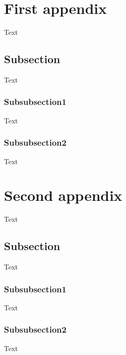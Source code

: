 \section{First appendix}\label{sec:first_appendix}
Text
\subsection{Subsection}
Text
\subsubsection{Subsubsection1}
Text
\subsubsection{Subsubsection2}
Text

\section{Second appendix}\label{sec:second_appendix}
Text
\subsection{Subsection}
Text
\subsubsection{Subsubsection1}
Text
\subsubsection{Subsubsection2}
Text
